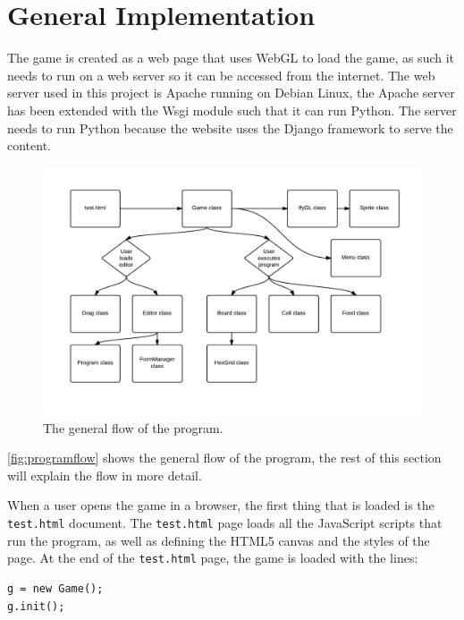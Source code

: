 \section{General Implementation}
The game is created as a web page that uses WebGL to load the game, as such it needs to run on a web server so it can be accessed from the internet. The web server used in this project is Apache running on Debian Linux, the Apache server has been extended with the Wsgi module such that it can run Python. The server needs to run Python because the website uses the Django framework to serve the content.

\begin{figure}[ht]
\begin{adjustwidth}{-5em}{-5em}
\includegraphics[width=1.3\textwidth]{img/Program_flow.pdf}
\caption{The general flow of the program.}
\label{fig:programflow}
\end{adjustwidth}
\end{figure}

\autoref{fig:programflow} shows the general flow of the program, the rest of this section will explain the flow in more detail.\newline

When a user opens the game in a browser, the first thing that is loaded is the \texttt{test.html} document. The \texttt{test.html} page loads all the JavaScript scripts that run the program, as well as defining the HTML5 canvas and the styles of the page. At the end of the \texttt{test.html} page, the game is loaded with the lines: 

\begin{lstlisting}
g = new Game();
g.init();
\end{lstlisting}

